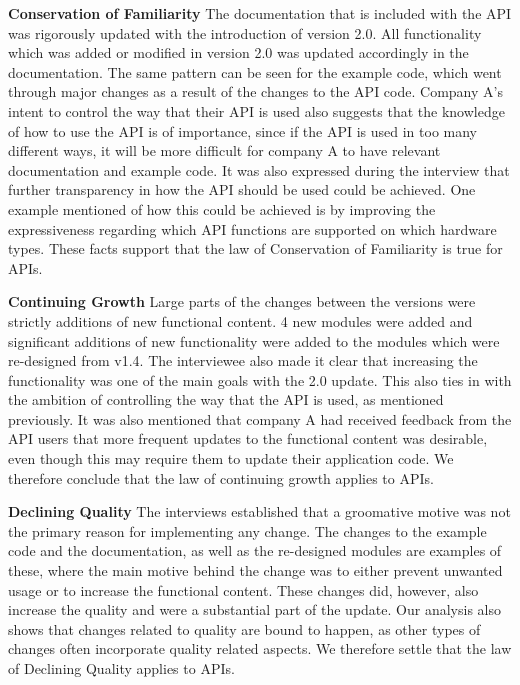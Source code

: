 \documentclass{sig-alternate}
\begin{document}
\smallskip \noindent
\textbf{Conservation of Familiarity  } 
The documentation that is included with the API was rigorously updated with the introduction of version 2.0. All functionality which was added or modified in version 2.0 was updated accordingly in the documentation. The same pattern can be seen for the example code, which went through major changes as a result of the changes to the API code. Company A's intent to control the way that their API is used also suggests that the knowledge of how to use the API is of importance, since if the API is used in too many different ways, it will be more difficult for company A to have relevant documentation and example code. It was also expressed during the interview that further transparency in how the API should be used could be achieved. One example mentioned of how this could be achieved is by improving the expressiveness regarding which API functions are supported on which hardware types. These facts support that the law of Conservation of Familiarity is true for APIs. 

\smallskip \noindent
\textbf{Continuing Growth  } 
Large parts of the changes between the versions were strictly additions of new functional content. 4 new modules were added and significant additions of new functionality were added to the modules which were re-designed from v1.4. The interviewee also made it clear that increasing the functionality was one of the main goals with the 2.0 update. This also ties in with the ambition of controlling the way that the API is used, as mentioned previously. It was also mentioned that company A had received feedback from the API users that more frequent updates to the functional content was desirable, even though this may require them to update their application code. We therefore conclude that the law of continuing growth applies to APIs. 

\smallskip \noindent
\textbf{Declining Quality  } 
The interviews established that a groomative motive was not the primary reason for implementing any change. The changes to the example code and the documentation, as well as the re-designed modules are examples of these, where the main motive behind the change was to either prevent unwanted usage or to increase the functional content. These changes did, however, also increase the quality and were a substantial part of the update. Our analysis also shows that changes related to quality are bound to happen, as other types of changes often incorporate quality related aspects. We therefore settle that the law of Declining Quality applies to APIs. 
\end{document}
